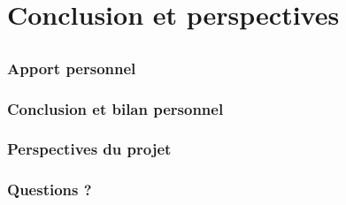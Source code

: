 \documentclass{beamer}
\begin{document}
\section{Conclusion et perspectives}
\subsection{}
\begin{frame}
\frametitle{Apport personnel}
\end{frame}

\begin{frame}
\frametitle{Conclusion et bilan personnel}
\end{frame}

\begin{frame}
\frametitle{Perspectives du projet}
\end{frame}

\begin{frame}
\frametitle{Questions ?}
\end{frame}
\end{document}
